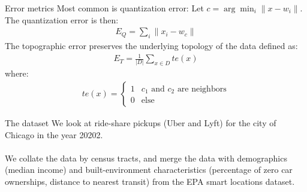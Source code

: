 \documentclass{beamer}
\begin{document}
\begin{frame}{Error metrics}
	Most common is quantization error:
	Let $c = \arg\min_i \|x-w_i \|$. The quantization error is then:
	\begin{align}
		E_Q = \sum_i \| x_i -w_c\|
	\end{align}
	The topographic error preserves the underlying topology of the data defined as:
	\begin{align}
		E_T = \frac{1}{|D|} \sum_{x\in D} te(x)
	\end{align}
	where:
	\begin{align}
		te(x) = \begin{cases}
			1 & \text{$c_1$ and $c_2$ are neighbors}\\
			0 & \text{else}
		\end{cases}
	\end{align}
\end{frame}
\begin{frame}{The dataset}
	We look at ride-share pickups (Uber and Lyft) for the city of Chicago in the year 20202. \\~\\
	We collate the data by census tracts, and merge the data with demographics (median income) and built-environment characteristics (percentage of zero car ownerships, distance to nearest transit) from the EPA smart locations dataset. 
\end{frame}
\end{document}
